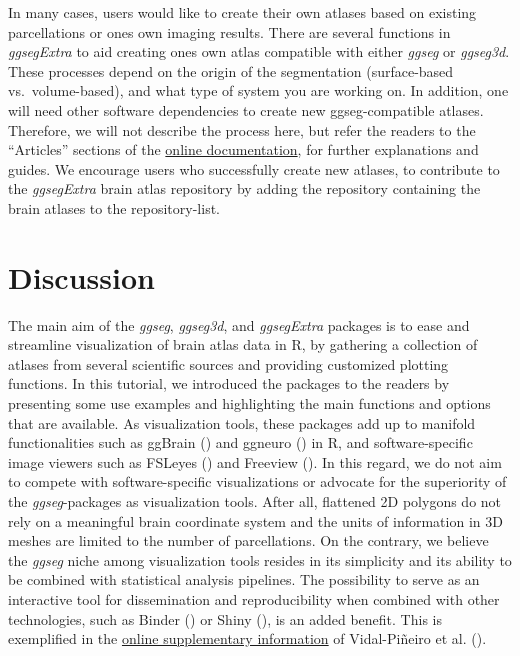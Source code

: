 \documentclass[fleqn,10pt]{wlpeerj} %
\begin{document}
In many cases, users would like to create their own atlases based on existing parcellations or ones own imaging results.
There are several functions in \emph{ggsegExtra} to aid creating ones own atlas compatible with either \emph{ggseg} or \emph{ggseg3d}.
These processes depend on the origin of the segmentation (surface-based vs.~volume-based), and what type of system you are working on.
In addition, one will need other software dependencies to create new ggseg-compatible atlases.
Therefore, we will not describe the process here, but refer the readers to the ``Articles'' sections of the \href{https://lcbc-uio.github.io/ggsegExtra/index.html}{online documentation}, for further explanations and guides.
We encourage users who successfully create new atlases, to contribute to the \emph{ggsegExtra} brain atlas repository by adding the repository containing the brain atlases to the repository-list.

\hypertarget{discussion}{%
\section{Discussion}\label{discussion}}

The main aim of the \emph{ggseg}, \emph{ggseg3d}, and \emph{ggsegExtra} packages is to ease and streamline visualization of brain atlas data in R, by gathering a collection of atlases from several scientific sources and providing customized plotting functions.
In this tutorial, we introduced the packages to the readers by presenting some use examples and highlighting the main functions and options that are available.
As visualization tools, these packages add up to manifold functionalities such as ggBrain (\citet{ggBrain}) and ggneuro (\citet{ggneuro}) in R, and software-specific image viewers such as FSLeyes (\citet{fsleyes}) and Freeview (\citet{dale_99}).
In this regard, we do not aim to compete with software-specific visualizations or advocate for the superiority of the \emph{ggseg}-packages as visualization tools.
After all, flattened 2D polygons do not rely on a meaningful brain coordinate system and the units of information in 3D meshes are limited to the number of parcellations.
On the contrary, we believe the \emph{ggseg} niche among visualization tools resides in its simplicity and its ability to be combined with statistical analysis pipelines.
The possibility to serve as an interactive tool for dissemination and reproducibility when combined with other technologies, such as Binder (\citet{binder}) or Shiny (\citet{shiny}), is an added benefit.
This is exemplified in the \href{https://athanasiamo.shinyapps.io/Virtual_histology_2019/}{online supplementary information} of Vidal-Piñeiro et al. (\citeyearpar{vidal_2019}).
\end{document}
